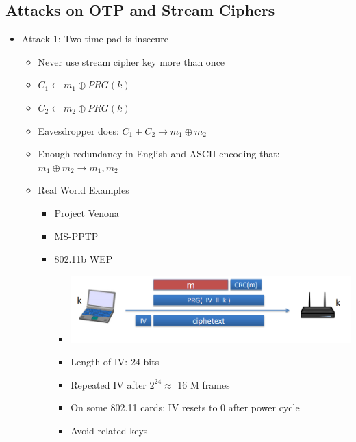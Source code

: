 \documentclass[]{article}
\begin{document}
\subsection{Attacks on OTP and Stream Ciphers}
\begin{itemize}
	\item Attack 1: Two time pad is insecure
	\begin{itemize}
		\item Never use stream cipher key more than once
		\item $C_{1} \leftarrow m_{1} \oplus PRG(k)$
		\item $C_{2} \leftarrow m_{2} \oplus PRG(k)$
		\item Eavesdropper does: $C_{1} + C_{2} \rightarrow m_{1} \oplus m_{2}$
		\item Enough redundancy in English and ASCII encoding that: $m_{1} \oplus m_{2} \rightarrow m_{1}, m_{2}$
		\item Real World Examples
		\begin{itemize}
			\item Project Venona
			\item MS-PPTP
			\item 802.11b WEP
			\begin{itemize}
				\item \includegraphics[scale=0.5]{Wep}
				\item Length of IV: 24 bits
				\item Repeated IV after $2^{24} \approx $ 16 M frames
				\item On some 802.11 cards: IV resets to 0 after power cycle
				\item Avoid related keys
			\end{itemize}
		\end{itemize}
	\end{itemize}
\end{itemize}
\end{document}
